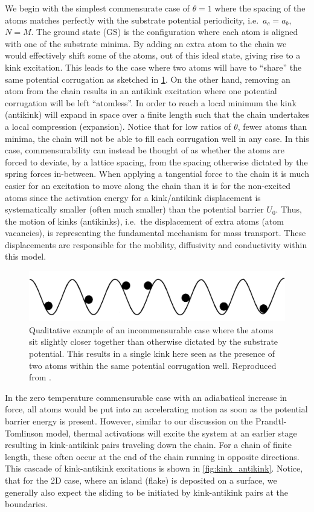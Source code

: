 We begin with the simplest commensurate case of $\theta = 1$ where the spacing
of the atoms matches perfectly with the substrate potential periodicity, i.e.\
$a_c = a_b$, $N = M$. The ground state (\acrshort{GS}) is the configuration
where each atom is aligned with one of the substrate minima. By adding an extra
atom to the chain we would effectively shift some of the atoms, out of this
ideal state, giving rise to a kink excitation. This leads to the case where two
atoms will have to ``share'' the same potential corrugation as sketched in
\cref{fig:incommensurable_example}. On the other hand, removing an atom from
the chain results in an antikink excitation where one potential corrugation will
be left ``atomless''. In order to reach a local minimum the kink (antikink) will
expand in space over a finite length such that the chain undertakes a local
compression (expansion). Notice that for low ratios of $\theta$, fewer atoms than minima, the chain will not be able to fill each corrugation well in any case. In this case, commensurability can instead be thought of as whether the atoms are forced to deviate, by a lattice spacing, from the spacing otherwise dictated by the spring forces in-between. When applying a tangential force to the chain it is much
easier for an excitation to move along the chain than it is for the non-excited
atoms since the activation energy for a kink/antikink
displacement is systematically smaller (often much smaller) than the potential
barrier $U_0$. Thus, the motion of kinks (antikinks), i.e.\ the displacement of
extra atoms (atom vacancies), is representing the fundamental mechanism for
mass transport. These displacements are responsible for the mobility,
diffusivity and conductivity within this model. 

\begin{figure}[!htb]
  \centering
  \includegraphics[width=0.55\linewidth]{figures/theory/incommensurable_example.png}
  \caption{Qualitative example of an incommensurable case where the atoms sit slightly closer together than otherwise dictated by the substrate potential. This results in a single kink here seen as the presence of two atoms within the same potential corrugation well. Reproduced from \cite{BRAUN19981}.}
  \label{fig:incommensurable_example}
\end{figure}


In the zero temperature commensurable case with an adiabatical increase in force, all atoms would be put into an accelerating motion as soon as the potential barrier energy is present. However, similar to our discussion on the Prandtl-Tomlinson model, thermal activations will excite the system at an earlier stage resulting in kink-antikink pairs traveling down the chain. For a chain of finite length, these often occur at the end of the chain running in opposite directions. This cascade of kink-antikink excitations is shown in \cref{fig:kink_antikink}. Notice, that for the 2D case, where an island (flake) is deposited on a surface, we generally also expect the sliding to be initiated by kink-antikink pairs at the boundaries. 


